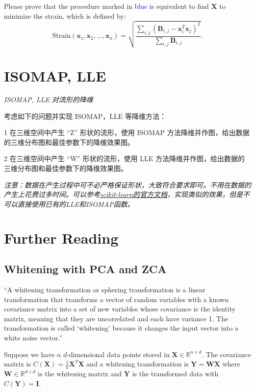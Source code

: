 \documentclass[UTF-8]{ctexart}
\theoremstyle{definition}
\theoremstyle{definition}
\theoremstyle{remark}
\begin{document}
Please prove that the procedure marked in \textcolor{blue}{blue} is equivalent to find $\mathbf X$ to minimize the strain, which is defined by:
\begin{equation}
\textrm{Strain}(\mathbf x_1,\mathbf x_2, \ldots, \mathbf x_n)=\sqrt{\frac{\sum_{i,j}\left(\mathbf B_{i,j} - \mathbf x_i^T\mathbf x_j\right)^2}{\sum_{i,j}\mathbf B_{i,j}}}.
\end{equation}


\section*{ISOMAP, LLE}\label{ISOMAP，LLE}
\emph{ISOMAP, LLE 对流形的降维}

考虑如下的问题并实现 ISOMAP，LLE 等降维方法：

1 在三维空间中产生 “Z” 形状的流形，使用 ISOMAP 方法降维并作图，给出数据的三维分布图和最佳参数下的降维效果图。

2 在三维空间中产生 “W” 形状的流形，使用 LLE 方法降维并作图，给出数据的三维分布图和最佳参数下的降维效果图。

\emph{注意：数据在产生过程中可不必严格保证形状，大致符合要求即可。不用在数据的产生上花费过多时间。可以参考\href{https://scikit-learn.org/stable/auto_examples/manifold/plot_compare_methods.html\#sphx-glr-auto-examples-manifold-plot-compare-methods-py}{scikit-learn的官方文档}，实现类似的效果，但是不可以直接使用已有的LLE和ISOMAP函数。}


\section*{Further Reading}

\subsection*{Whitening with PCA and ZCA}

``A whitening transformation or sphering transformation is a linear transformation that transforms a vector of random variables with a known covariance matrix into a set of new variables whose covariance is the identity matrix, meaning that they are uncorrelated and each have variance 1. The transformation is called `whitening' because it changes the input vector into a white noise vector.''\cite{whitening}

Suppose we have $n$ $d$-dimensional data points stored in $\mathbf X \in \mathbb R^{n \times d}$. The covariance matrix is $C(\mathbf{X}) = \frac{1}{n} \mathbf{X}^{T} \mathbf{X}$ and a whitening transformation is $\mathbf{Y} = \mathbf{W} \mathbf{X}$ where $\mathbf{W} \in \mathbb R^{d \times d}$ is the whitening matrix and $\mathbf{Y}$ is the transformed data with $C(\mathbf{Y}) = \mathbf{I}$. 
\end{document}
